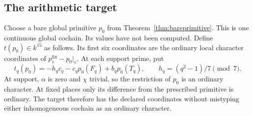 \subsection{The arithmetic target}
Choose a bare global primitive $p_0$ from Theorem~\ref{thm:bareprimitive}. This is one continuous global cochain. Its values have not been computed. Define $t(p_0)\in k^{15}$ as follows. Its first six coordinates are the ordinary local character coordinates of $p_v^{\mathrm{fix}}-p_0|_v$. At each support prime, put
\begin{equation}\label{eq:target}
t_q(p_0)=-h_qc_q-c_qp_0(F_q)+b_qp_0(T_q),
\qquad h_q=(q^2-1)/7\pmod7.
\end{equation}
At support, $\alpha$ is zero and $\chi$ trivial, so the restriction of $p_0$ is an ordinary character. At fixed places only its difference from the prescribed primitive is ordinary. The target therefore has the declared coordinates without mistyping either inhomogeneous cochain as an ordinary character.

